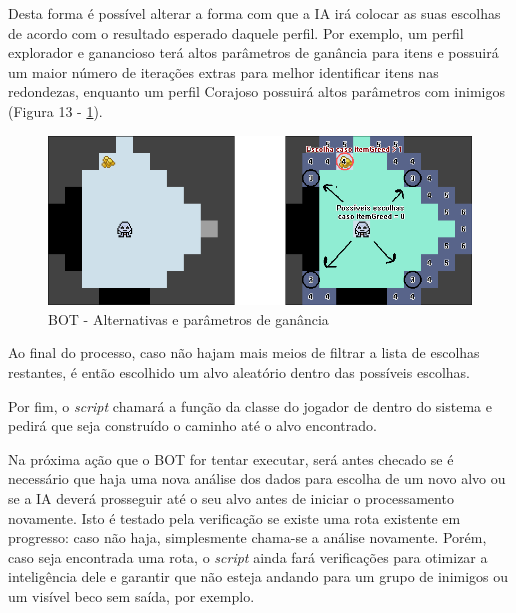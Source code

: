 Desta forma é possível alterar a forma com que a IA irá colocar as suas escolhas de acordo com o resultado esperado daquele perfil. Por exemplo, um perfil explorador e ganancioso terá altos parâmetros de ganância para itens e possuirá um maior número de iterações extras para melhor identificar itens nas redondezas, enquanto um perfil Corajoso possuirá altos parâmetros com inimigos (Figura 13 - \ref{fig13}).

\begin{figure}[h]
	\centering
	\label{fig13}
		\includegraphics[keepaspectratio=true,scale=0.5]{figuras/fig13-bot2.png}
	\caption{BOT - Alternativas e parâmetros de ganância}
\end{figure}

Ao final do processo, caso não hajam mais meios de filtrar a lista de escolhas restantes, é então escolhido um alvo aleatório dentro das possíveis escolhas.

Por fim, o \textit{script} chamará a função da classe do jogador de dentro do sistema e pedirá que seja construído o caminho até o alvo encontrado. 

Na próxima ação que o BOT for tentar executar, será antes checado se é necessário que haja uma nova análise dos dados para escolha de um novo alvo ou se a IA deverá prosseguir até o seu alvo antes de iniciar o processamento novamente. Isto é testado pela verificação se existe uma rota existente em progresso: caso não haja, simplesmente chama-se a análise novamente.
Porém, caso seja encontrada uma rota, o \textit{script} ainda fará verificações para otimizar a inteligência dele e garantir que não esteja andando para um grupo de inimigos ou um visível beco sem saída, por exemplo.


